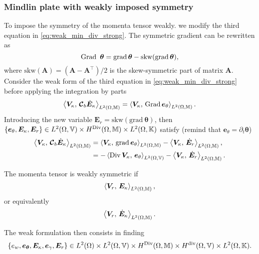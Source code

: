\subsubsection{Mindlin plate with weakly imposed symmetry}\label{sec:min_weak}
To impose the symmetry of the momenta tensor weakly. we modify the third equation in \eqref{eq:weak_min_div_strong}. The symmetric gradient can be rewritten as 
\[
\Grad\ \bm{\theta} = \grad \bm{\theta} - \mathrm{skw}(\grad \bm{\theta}),
\]
where $\mathrm{skw}(\bm{A})=(\bm{A} - \bm{A}^\top)/2$ is the skew-symmetric part of matrix $\bm{A}$. Consider the weak form of the third equation in \eqref{eq:weak_min_div_strong} before applying the integration by parts
\[
\inner[L^2(\Omega, \mathbb{M})]{\bm{V}_\kappa}{\bm{\mathcal{C}}_b \dot{\bm{E}}_\kappa} = \inner[L^2(\Omega, \mathbb{M})]{\bm{V}_\kappa}{\Grad \bm{e}_\theta}. 
\] Introducing the new variable $\bm{E}_r = \mathrm{skw}(\mathrm{grad}\ \bm{\theta})$, then $\{\bm{e}_\theta, \bm{E}_\kappa, \bm{E}_r\} \in L^2(\Omega, \mathbb{V}) \times H^{\Div}(\Omega, \mathbb{M}) \times L^2(\Omega, \mathbb{K})$ satisfy (remind that $\bm{e}_\theta = \partial_t {\bm{\theta}}$)
\begin{equation*}
\begin{aligned}
\inner[L^2(\Omega, \mathbb{M})]{\bm{V}_\kappa}{\bm{\mathcal{C}}_b \dot{\bm{E}}_\kappa} &= \inner[L^2(\Omega, \mathbb{M})]{\bm{V}_\kappa}{\grad \bm{e}_\theta} - \inner[L^2(\Omega, \mathbb{M})]{\bm{V}_\kappa}{\dot{\bm{E}}_r}, \\
&= -\inner[L^2(\Omega, \mathbb{V})]{\Div\bm{V}_\kappa}{\bm{e}_\theta} - \inner[L^2(\Omega, \mathbb{M})]{\bm{V}_\kappa}{\dot{\bm{E}}_r}.
\end{aligned}
\end{equation*}


The momenta tensor is weakly symmetric if 
$$\inner[L^2(\Omega, \mathbb{M})]{\bm{V}_r}{\bm{E}_{\kappa}},$$
or equivalently 
$$\inner[L^2(\Omega, \mathbb{M})]{\bm{V}_r}{\dot{\bm{E}}_{\kappa}}.$$

The weak formulation then consists in finding 
\[
\{e_w, \bm{e}_{\bm{\theta}}, \bm{E}_{\kappa}, \bm{e}_{\gamma}, \bm{E}_{r}\} \in L^2(\Omega) \times L^2(\Omega, \mathbb{V}) \times H^{\Div}(\Omega, \mathbb{M}) \times H^{\div}(\Omega, \mathbb{V}) \times L^2(\Omega, \mathbb{K}).
\]



